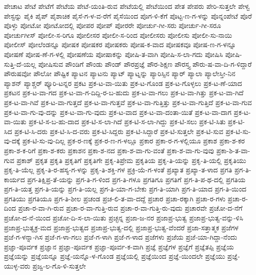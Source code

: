 {ಪೇಚಾಟ
ಪೇಟೆ
ಪೇಟೆಗೆ
ಪೇಟೆಯ
ಪೇಟೆ-ಯಂತಿ-ರುವ
ಪೇಟೆಯಲ್ಲಿ
ಪೇಟೆಯಿಂದ
ಪೇತ
ಪೇಪರು
ಪೇರಿ-ಸುತ್ತಲೇ
ಪೇಳ್ವ
ಪೇಸ್ಟನ್ನು
ಪೈಕಿ
ಪೈಪ್
ಪೈಶಾಚಿಕ
ಪೈಸೆ-ಗ-ಳ-ವ-ರೆಗೆ
ಪೈಸೆಯಿಂದ
ಪೊಗ-ಳಿ-ಕೆಗೆ
ಪೊಟ್ಟ-ಣ-ಗ-ಳನ್ನು
ಪೊನ್ನಂಪೇಟೆ
ಪೊರೆ
ಪೊಳ್ಳು
ಪೋಟೋ
ಪೋಟೋದಲ್ಲಿ
ಪೋಪರ
ಪೋಪ್
ಪೋರರೇ
ಪೋರ್ಚು-ಗೀ-ಸರು
ಪೋರ್ಚು-ಗೀ-ಸರೂ
ಪೋರ್ಚುಗೀಸ್
ಪೋಲೀ-ಸ-ರಿಗೂ
ಪೋಲೀಸರ
ಪೋಲೀ-ಸ-ರಿಂದ
ಪೋಲೀಸರು
ಪೋಲೀಸು
ಪೋಲೀ-ಸು-ನಾಯಿ
ಪೋಲೀಸ್
ಪೋಲೆಂಡನ್ನೂ
ಪೋಷಕ
ಪೋಷಕರ
ಪೋಷಕರು
ಪೋಷ-ಕ-ವಾದ
ಪೋಷಕವೂ
ಪೋಷ-ಣ-ಗ-ಳನ್ನೂ
ಪೋಷಣೆ
ಪೋಷ-ಣೆ-ಗ-ಳಲ್ಲಿ
ಪೋಷಣೆಯ
ಪೋಷಾಕನ್ನು
ಪೋಷಿ-ತ-ವಾಗಿ
ಪೋಷಿ-ಸ-ಲಾ-ಗದು
ಪೋಷಿಸಿ
ಪೋಷಿ-ಸುತ್ತಿ-ದೆ-ಯಲ್ಲ
ಪೋಷಿಸುವ
ಪೌಂಡಿಗೆ
ಪೌಂಡು
ಪೌಂಡ್
ಪೌರಪ್ರಜ್ಞೆ
ಪೌರ-ಶಿಕ್ಷಣ
ಪೌರಸ್ತ್ಯ
ಪೌರು-ಷ-ವಾ-ದಿ-ಗ-ಳಿದ್ದಾರೆ
ಪೌರುಷವೋ
ಪೌಲೋ
ಪೌಷ್ಟಿಕ
ಪ್ಯಾಟನ
ಪ್ಯಾಟನು
ಪ್ಯಾಟ್
ಪ್ಯಾಟ್ನನ್ನು
ಪ್ಯಾರಿಸ್ಸಿನ
ಪ್ಯಾರ್
ಪ್ಯಾಲಾ
ಪ್ಯಾಲೇಸ್ತೀ-ನಿನ
ಪ್ಯಾಶನ್
ಪ್ಯಾಶ್ಚರ್
ಪ್ಯೂರಿ-ಟನ್ನರ
ಪ್ರಕಟ
ಪ್ರಕ-ಟ-ವಾ-ಯಿತು
ಪ್ರಕ-ಟ-ಗೊಂಡ
ಪ್ರಕ-ಟ-ಗೊಳ್ಳಲು
ಪ್ರಕ-ಟ-ಣೆ-ಯಾದ
ಪ್ರಕಟನ
ಪ್ರಕ-ಟ-ವಾ-ಗದ
ಪ್ರಕ-ಟ-ವಾ-ಗ-ದಿದ್ದಿ-ರ-ಬ-ಹುದು
ಪ್ರಕ-ಟ-ವಾ-ಗಲು
ಪ್ರಕ-ಟ-ವಾ-ಗಿತ್ತು
ಪ್ರಕ-ಟ-ವಾ-ಗಿದೆ
ಪ್ರಕ-ಟ-ವಾ-ಗಿವೆ
ಪ್ರಕ-ಟ-ವಾ-ಗುತ್ತದೆ
ಪ್ರಕ-ಟ-ವಾ-ಗುತ್ತವೆ
ಪ್ರಕ-ಟ-ವಾ-ಗುತ್ತಿತ್ತು
ಪ್ರಕ-ಟ-ವಾ-ಗುತ್ತಿದೆ
ಪ್ರಕ-ಟ-ವಾ-ಗುವ
ಪ್ರಕ-ಟ-ವಾ-ಗು-ವು-ದನ್ನು
ಪ್ರಕ-ಟ-ವಾ-ಗು-ವುದು
ಪ್ರಕ-ಟ-ವಾದ
ಪ್ರಕ-ಟ-ವಾ-ದಂತಾ-ಯಿತೆ
ಪ್ರಕ-ಟ-ವಾ-ದಾಗ
ಪ್ರಕ-ಟ-ವಾ-ಯಿತು
ಪ್ರಕ-ಟಿ-ಸ-ಬ-ಹು-ದಾದ
ಪ್ರಕ-ಟಿ-ಸ-ಲಾ-ಗಿದೆ
ಪ್ರಕ-ಟಿ-ಸ-ಲಾ-ಗಿದ್ದು
ಪ್ರಕ-ಟಿ-ಸಲು
ಪ್ರಕ-ಟಿ-ಸಿತು
ಪ್ರಕ-ಟಿ-ಸಿದ
ಪ್ರಕ-ಟಿ-ಸಿ-ದರು
ಪ್ರಕ-ಟಿ-ಸಿ-ದ-ವರು
ಪ್ರಕ-ಟಿ-ಸಿದ್ದರು
ಪ್ರಕ-ಟಿ-ಸಿದ್ದಾರೆ
ಪ್ರಕ-ಟಿ-ಸುತ್ತಲೇ
ಪ್ರಕ-ಟಿ-ಸುವ
ಪ್ರಕ-ಟಿ-ಸು-ವು-ದಕ್ಕೆ
ಪ್ರಕ-ಟಿ-ಸು-ವು-ದಿಲ್ಲ
ಪ್ರಕ-ರ-ಣಕ್ಕೆ
ಪ್ರಕ-ರ-ಣ-ಗ-ಳಲ್ಲೂ
ಪ್ರಕಾರ
ಪ್ರಕಾ-ರ-ಗ-ಳಲ್ಲಿಯೂ
ಪ್ರಕಾಶ
ಪ್ರಕಾ-ಶ-ಕರ
ಪ್ರಕಾ-ಶ-ಕ-ರಿಗೆ
ಪ್ರಕಾ-ಶ-ಕರು
ಪ್ರಕಾಶನ
ಪ್ರಕಾ-ಶ-ನದ
ಪ್ರಕಾ-ಶ-ವಾ-ಗು-ವಂತೆ
ಪ್ರಕಾ-ಶ-ವಾ-ಗು-ವುವು
ಪ್ರಕಾ-ಶಿ-ತ-ವಾ-ಗುವ
ಪ್ರಕಾಶ್
ಪ್ರಕೃತ
ಪ್ರಕೃತಿ
ಪ್ರಕೃತಿಗೆ
ಪ್ರಕೃತಿಗೇ
ಪ್ರಕೃ-ತಿಪ್ರೇಮ
ಪ್ರಕೃತಿಯ
ಪ್ರಕೃ-ತಿ-ಯನ್ನು
ಪ್ರಕೃ-ತಿ-ಯಲ್ಲಿ
ಪ್ರಕೃತಿಯು
ಪ್ರಕೃ-ತಿ-ಯೆಲ್ಲ
ಪ್ರಕೃ-ತಿ-ರ-ಹಸ್ಯ-ಗ-ಳನ್ನು
ಪ್ರಕೃ-ತಿ-ಶಕ್ತಿ-ಗಳ
ಪ್ರಕ್ರಿ-ಯೆ-ಗ-ಳಂತೆ
ಪ್ರಖ್ಯಾತ
ಪ್ರಖ್ಯಾ-ತ-ಳಾದ
ಪ್ರಗತಿ
ಪ್ರಗ-ತಿ-ಕಾರ್ಯದ
ಪ್ರಗ-ತಿಕ್ಷಿಪ್ರ-ತೆ-ಯನ್ನು
ಪ್ರಗ-ತಿ-ಗ-ಳಿಂದ
ಪ್ರಗ-ತಿ-ಗಳೂ
ಪ್ರಗತಿಗೂ
ಪ್ರಗತಿಗೆ
ಪ್ರಗ-ತಿ-ಪ-ಥ-ದಲ್ಲಿ
ಪ್ರಗತಿಯ
ಪ್ರಗ-ತಿ-ಯತ್ತ
ಪ್ರಗ-ತಿ-ಯನ್ನು
ಪ್ರಗ-ತಿ-ಯಲ್ಲ
ಪ್ರಗ-ತಿ-ಯಾ-ಗ-ಬೇಕು
ಪ್ರಗ-ತಿ-ಯಾಗಿ
ಪ್ರಗ-ತಿ-ಯಾದ
ಪ್ರಗ-ತಿ-ಯಿಂದ
ಪ್ರಗತಿಯು
ಪ್ರಗತಿಯೂ
ಪ್ರಗ-ತಿ-ಶೀಲ
ಪ್ರಚಂಡ
ಪ್ರಚ-ಲಿ-ತ-ವಾ-ದದ್ದೆ
ಪ್ರಚಾರ
ಪ್ರಚಾ-ರಕ್ಕಾಗಿ
ಪ್ರಚಾ-ರ-ಗಳು
ಪ್ರಚಾ-ರ-ದಿಂದ
ಪ್ರಚಾ-ರ-ವಾ-ಗಿ-ರುವ
ಪ್ರಚಾ-ರ-ವಾ-ಗುತ್ತಿ-ರುವ
ಪ್ರಚಾ-ರ-ವಾ-ಗುತ್ತಿ-ರು-ವುದು
ಪ್ರಚಾರವೇ
ಪ್ರಚೋ-ದ-ನೆಗೆ
ಪ್ರಚೋ-ದ-ನೆ-ಯಿಂದ
ಪ್ರಚೋ-ದಿ-ಸ-ಲಾ-ಯಿತು
ಪ್ರಚ್ಛನ್ನ
ಪ್ರಜಾ-ಜ-ನರ
ಪ್ರಜಾಪ್ರ-ಭುತ್ವ
ಪ್ರಜಾಪ್ರ-ಭುತ್ವ-ವನ್ನು-ಳಿಸಿ
ಪ್ರಜಾಪ್ರ-ಭುತ್ವಕ್ರ-ಮದ
ಪ್ರಜಾಪ್ರ-ಭುತ್ವದ
ಪ್ರಜಾಪ್ರ-ಭುತ್ವ-ದಲ್ಲಿ
ಪ್ರಜಾಪ್ರ-ಭುತ್ವ-ವೆಂದರೆ
ಪ್ರಜಾ-ಸತ್ತಾತ್ಮಕ
ಪ್ರಜೆಗಳ
ಪ್ರಜೆ-ಗ-ಳನ್ನಾ-ಗಿಸ
ಪ್ರಜೆ-ಗ-ಳಾ-ಗಲು
ಪ್ರಜೆ-ಗ-ಳಾಗಿ
ಪ್ರಜೆ-ಗ-ಳಾದ
ಪ್ರಜೆಗಳು
ಪ್ರಜೆಯ
ಪ್ರಜೆ-ಯಾ-ಗಿದ್ದಾ-ನೆಂದು
ಪ್ರಜ್ಞಾ-ಪೂರ್ವಕ
ಪ್ರಜ್ಞಾನ
ಪ್ರಜ್ಞಾ-ಪೂರ್ವಕ
ಪ್ರಜ್ಞಾ-ಪೂರ್ವ-ಕ-ವಾಗಿ
ಪ್ರಜ್ಞೆ
ಪ್ರಜ್ಞೆಗಳ
ಪ್ರಜ್ಞೆಗೆ
ಪ್ರಜ್ಞೆತಪ್ಪಿ
ಪ್ರಜ್ಞೆಯ
ಪ್ರಜ್ಞೆಯನ್ನು
ಪ್ರಜ್ಞೆಯನ್ನೂ
ಪ್ರಜ್ಞೆ-ಯನ್ನೊ-ಳ-ಗೊಂಡ
ಪ್ರಜ್ಞೆಯಲ್ಲಿ
ಪ್ರಜ್ಞೆಯಿಂದ
ಪ್ರಜ್ಞೆ-ಯಿಂದಲೇ
ಪ್ರಜ್ಞೆಯು
ಪ್ರಜ್ಞೆ-ಯುಳ್ಳ-ವರು
ಪ್ರಜ್ವ-ಲ-ಗೊ-ಳಿ-ಸುತ್ತಲೇ
}
